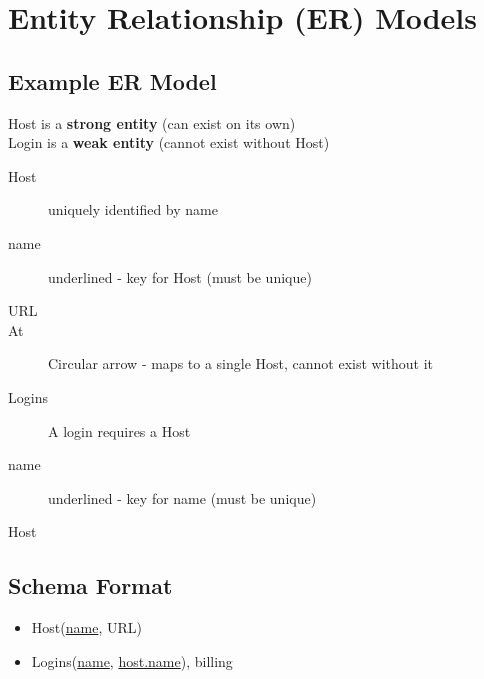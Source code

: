 \documentclass{article}
\begin{document}
\section{Entity Relationship (ER) Models}
\subsection{Example ER Model}
Host is a \textbf{strong entity} (can exist on its own)\\
Login is a \textbf{weak entity} (cannot exist without Host)\\
\begin{description}
  \item[Host] uniquely identified by name
  \item[name] underlined - key for Host (must be unique)
  \item[URL]
  \item[At] Circular arrow - maps to a single Host, cannot exist without it
  \item[Logins] A login requires a Host
  \item[name] underlined - key for name (must be unique)
  \item[Host]
\end{description}

\subsection{Schema Format}
\begin{itemize}
  \item{Host(\underline{name}, URL)}
  \item{Logins(\underline{name}, \underline{host.name}), billing}
\end{itemize}
\end{document}
